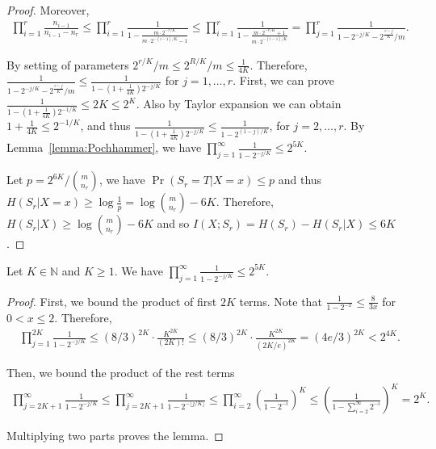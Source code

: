 \begin{proof}
  Moreover, 
  \begin{align}
    \prod_{i=1}^{r} \frac{n_{i-1}}{n_{i-1}-n_r}
    \le\prod_{i=1}^{r} \frac{1}{1-\frac{m\cdot 2^{-r/K}}{m\cdot 2^{-(i-1)/K}-1}}
    \le\prod_{i=1}^{r} \frac{1}{1-\frac{m\cdot 2^{-r/K}+1}{m\cdot 2^{-(i-1)/K}}}
    =\prod_{j=1}^{r} \frac{1}{1-2^{-j/K}-2^{\frac{r-j}{K}}/m}.
  \end{align}
  
  By setting of parameters $2^{r/K}/m \le 2^{R/K}/m \le \frac{1}{4K}$.
  Therefore, $\frac{1}{1-2^{-j/K}-2^{\frac{r-j}{K}}/m}\le \frac{1}{1-(1+\frac{1}{4K})2^{-j/K}}$ for $j=1,\ldots,r$.
  First, we can prove $\frac{1}{1-(1+\frac{1}{4K})2^{-1/K}}\le 2K \le 2^K$. 
  Also by Taylor expansion we can obtain $1+\frac{1}{4K}\le 2^{-1/K}$, and thus $\frac{1}{1-(1+\frac{1}{4K})2^{-j/K}}\le \frac{1}{1-2^{(1-j)/K}}$, for $j=2,\ldots, r$. 
  By Lemma~\ref{lemma:Pochhammer}, we have $\prod_{j=1}^{\infty} \frac{1}{1-2^{-j/K}}\le 2^{5K}$. 
  
  Let $p={2^{6K}}/{{m\choose n_r}}$, we have $\Pr(S_r=T|X=x)\le p$ and thus $H(S_r|X=x)\ge \log\frac{1}{p}=\log{{m\choose n_r}}-6K$. Therefore, $H(S_r|X)\ge \log{{m\choose n_r}}-6K$ and so $I(X;S_r)=H(S_r)-H(S_r|X)\le 6K$.  
\end{proof}

\begin{lemma}\label{lemma:Pochhammer}
  Let $K\in \mathbb{N}$ and $K\ge 1$. We have $\prod_{j=1}^{\infty} \frac{1}{1-2^{-j/K}}\le 2^{5K}$.
\end{lemma}

\begin{proof}
  First, we bound the product of first $2K$ terms. Note that $\frac{1}{1-2^{-x}}\le \frac{8}{3x}$ for $0<x\le 2$. Therefore, 
  \begin{align}
    \prod_{j=1}^{2K}\frac{1}{1-2^{-j/K}}
    \le (8/3)^{2K}\cdot \frac{K^{2K}}{(2K)!}
    \le (8/3)^{2K}\cdot \frac{K^{2K}}{(2K/e)^{2K}}
    = (4e/3)^{2K}
    < 2^{4K}. 
  \end{align}
  
  Then, we bound the product of the rest terms
  \begin{align}
    \prod_{j=2K+1}^{\infty}\frac{1}{1-2^{-j/K}} 
    \le \prod_{j=2K+1}^{\infty}\frac{1}{1-2^{-\lfloor j/K \rfloor}} 
    \le \prod_{i=2}^{\infty}\left( \frac{1}{1-2^{-i}}\right)^K 
    \le \left( \frac{1}{1-\sum_{i=2}^{\infty}2^{-i}}\right)^K
    = 2^K.
  \end{align}
  
  Multiplying two parts proves the lemma.
\end{proof}

